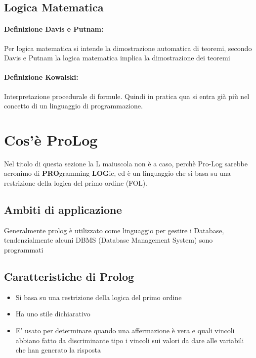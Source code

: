 \documentclass[12pt, a4paper, openany, oneside]{book}
\begin{document}
{\subsection{Logica Matematica}
\paragraph{Definizione Davis e Putnam: } Per logica matematica si intende la
dimostrazione automatica di teoremi, secondo Davis e Putnam la logica matematica
implica la dimostrazione dei teoremi
\paragraph{Definizione Kowalski: } Interpretazione procedurale di formule. 
Quindi in pratica qua si entra già più nel concetto di un linguaggio
di programmazione.
\section{Cos'è ProLog}
Nel titolo di questa sezione la L maiuscola non è a caso, perchè Pro-Log sarebbe
acronimo di \textbf{PRO}gramming \textbf{LOG}ic, ed è un linguaggio che si basa
su una restrizione della logica del primo ordine (FOL).
\subsection{Ambiti di applicazione}
Generalmente prolog è utilizzato come linguaggio per gestire i Database, 
tendenzialmente alcuni DBMS (Database Management System) sono programmati 
\subsection{Caratteristiche di Prolog}
\begin{itemize}
	\item Si basa su una restrizione della logica del primo ordine
	\item Ha uno stile dichiarativo
	\item E' usato per determinare quando una affermazione è vera e quali vincoli
	abbiano fatto da discriminante tipo i vincoli sui valori da dare alle 
	variabili che han generato la risposta
\end{itemize}
}
\end{document}
